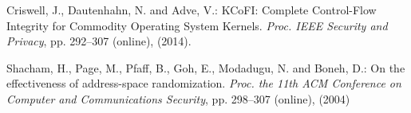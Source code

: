 \documentclass[english,preprint,JIP]{ipsj}
\begin{document}
\begin{thebibliography}{99}
  Criswell, J., Dautenhahn, N. and Adve, V.: KCoFI: Complete Control-Flow Integrity for Commodity Operating System Kernels. \textit{Proc. IEEE Security and Privacy}, pp. 292--307 (online),  (2014).


  Shacham, H., Page, M., Pfaff, B., Goh, E., Modadugu, N. and Boneh, D.: On the effectiveness of address-space randomization. \textit{Proc. the 11th ACM Conference on Computer and Communications Security}, pp. 298--307 (online),  (2004)
  

\end{thebibliography}
\end{document}
